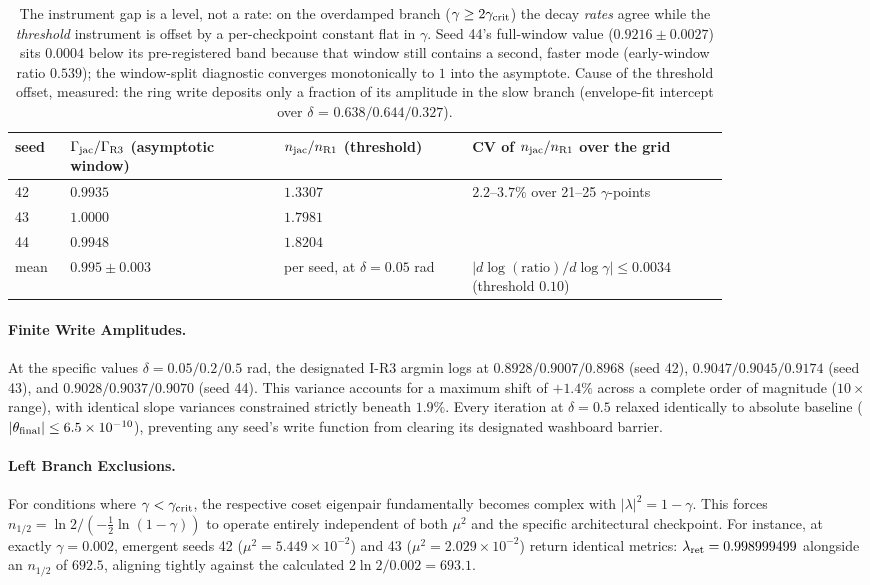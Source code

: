 \documentclass{article}
\begin{document}
\begin{table}[!htb]\centering\small
\caption{The instrument gap is a level, not a rate: on the overdamped branch ($\gamma\ge2\gamma_{\rm crit}$) the decay \emph{rates} agree while the \emph{threshold} instrument is offset by a per-checkpoint constant flat in $\gamma$. Seed 44's full-window value ($0.9216\pm0.0027$) sits $0.0004$ below its pre-registered band because that window still contains a second, faster mode (early-window ratio $0.539$); the window-split diagnostic converges monotonically to $1$ into the asymptote. Cause of the threshold offset, measured: the ring write deposits only a fraction of its amplitude in the slow branch (envelope-fit intercept over $\delta$ = $0.638/0.644/0.327$).}
\begin{tabular}{p{0.06\linewidth}p{0.25\linewidth}p{0.22\linewidth}p{0.30\linewidth}}
\toprule
seed & $\Gamma_{\rm jac}/\Gamma_{\rm R3}$ (asymptotic window) & $n_{\rm jac}/n_{\rm R1}$ (threshold) & CV of $n_{\rm jac}/n_{\rm R1}$ over the grid\\
\midrule
42 & $0.9935$ & $1.3307$ & \multirow{3}{*}{$2.2$--$3.7\%$ over 21--25 $\gamma$-points}\\
43 & $1.0000$ & $1.7981$ & \\
44 & $0.9948$ & $1.8204$ & \\
\midrule
mean & $0.995\pm0.003$ & per seed, at $\delta=0.05$ rad & $|d\log(\text{ratio})/d\log\gamma|\le0.0034$ (threshold $0.10$)\\
\bottomrule
\end{tabular}
\end{table}

\paragraph{Finite Write Amplitudes.} At the specific values $\delta=0.05/0.2/0.5$ rad, the designated I-R3 argmin logs at $0.8928/0.9007/0.8968$ (seed 42), $0.9047/0.9045/0.9174$ (seed 43), and $0.9028/0.9037/0.9070$ (seed 44). This variance accounts for a maximum shift of $+1.4\%$ across a complete order of magnitude ($10\times$ range), with identical slope variances constrained strictly beneath $1.9\%$. Every iteration at $\delta=0.5$ relaxed identically to absolute baseline ($|\theta_{\rm final}|\le6.5\times10^{-10}$), preventing any seed's write function from clearing its designated washboard barrier.

\paragraph{Left Branch Exclusions.} For conditions where $\gamma<\gamma_{\rm crit}$, the respective coset eigenpair fundamentally becomes complex with $|\lambda|^2=1-\gamma$. This forces $n_{1/2}=\ln2/(-\tfrac12\ln(1-\gamma))$ to operate entirely independent of both $\mu^2$ and the specific architectural checkpoint. For instance, at exactly $\gamma=0.002$, emergent seeds 42 ($\mu^2=5.449\times10^{-2}$) and 43 ($\mu^2=2.029\times10^{-2}$) return identical metrics: $\lambda_{\rm ret}=0.998999499$ alongside an $n_{1/2}$ of $692.5$, aligning tightly against the calculated $2\ln2/0.002=693.1$.
\end{document}
